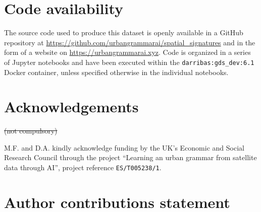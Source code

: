 \documentclass[fleqn,10pt]{wlscirep}
\providecommand{\DIFdel}[1]{{\protect\color{red}\sout{#1}}}                      %
\providecommand{\DIFdelbegin}{} %
\providecommand{\DIFdelend}{} %
\begin{document}
\section*{Code availability}

The source code used to produce this dataset is openly available in a GitHub repository
at \newline
\hyperlink{https://github.com/urbangrammarai/spatial\_signatures}{https://github.com/urbangrammarai/spatial\_signatures}
and in the form of a website on
\hyperlink{https://urbangrammarai.xyz}{https://urbangrammarai.xyz}.
Code is
organized in a series of Jupyter notebooks and have been executed within the
\texttt{darribas:gds\_dev:6.1}\cite{gds_env}
Docker container, unless specified otherwise in the individual notebooks.




\section*{Acknowledgements}
\DIFdelbegin \DIFdel{(not compulsory)
}\DIFdelend 


M.F. and D.A. kindly acknowledge funding by the UK's Economic and Social Research
Council through the project ``Learning an urban grammar from satellite data
through AI'', project reference \texttt{ES/T005238/1}.

\section*{Author contributions statement}
\end{document}
